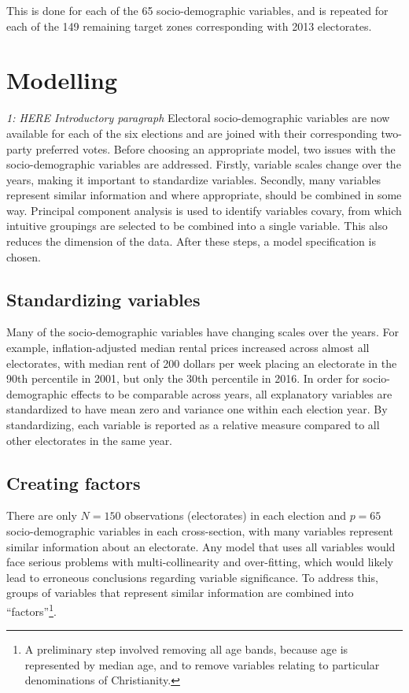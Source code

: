 \documentclass[11pt,a4paper,]{article}
\begin{document}
This is done for each of the 65 socio-demographic variables, and is repeated for each of the 149 remaining target zones corresponding with 2013 electorates.

\hypertarget{modelling}{%
\section{Modelling}\label{modelling}}

\emph{1: HERE Introductory paragraph}
Electoral socio-demographic variables are now available for each of the six elections and are joined with their corresponding two-party preferred votes. Before choosing an appropriate model, two issues with the socio-demographic variables are addressed. Firstly, variable scales change over the years, making it important to standardize variables. Secondly, many variables represent similar information and where appropriate, should be combined in some way. Principal component analysis is used to identify variables covary, from which intuitive groupings are selected to be combined into a single variable. This also reduces the dimension of the data. After these steps, a model specification is chosen.

\hypertarget{standardizing-variables}{%
\subsection{Standardizing variables}\label{standardizing-variables}}

Many of the socio-demographic variables have changing scales over the years. For example, inflation-adjusted median rental prices increased across almost all electorates, with median rent of 200 dollars per week placing an electorate in the 90th percentile in 2001, but only the 30th percentile in 2016. In order for socio-demographic effects to be comparable across years, all explanatory variables are standardized to have mean zero and variance one within each election year. By standardizing, each variable is reported as a relative measure compared to all other electorates in the same year.

\hypertarget{creating-factors}{%
\subsection{Creating factors}\label{creating-factors}}

There are only \(N = 150\) observations (electorates) in each election and \(p = 65\) socio-demographic variables in each cross-section, with many variables represent similar information about an electorate. Any model that uses all variables would face serious problems with multi-collinearity and over-fitting, which would likely lead to erroneous conclusions regarding variable significance. To address this, groups of variables that represent similar information are combined into ``factors''\footnote{A preliminary step involved removing all age bands, because age is represented by median age, and to remove variables relating to particular denominations of Christianity.}.
\end{document}
